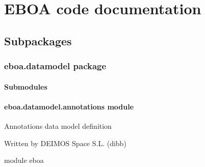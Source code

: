 \chapter{EBOA code documentation}
\section{Subpackages}
\label{\detokenize{eboa:subpackages}}

\subsection{eboa.datamodel package}
\label{\detokenize{eboa.datamodel:eboa-datamodel-package}}\label{\detokenize{eboa.datamodel::doc}}

\subsubsection{Submodules}
\label{\detokenize{eboa.datamodel:submodules}}

\subsubsection{eboa.datamodel.annotations module}
\label{\detokenize{eboa.datamodel:module-eboa.datamodel.annotations}}\label{\detokenize{eboa.datamodel:eboa-datamodel-annotations-module}}
Annotations data model definition

Written by DEIMOS Space S.L. (dibb)

module eboa

